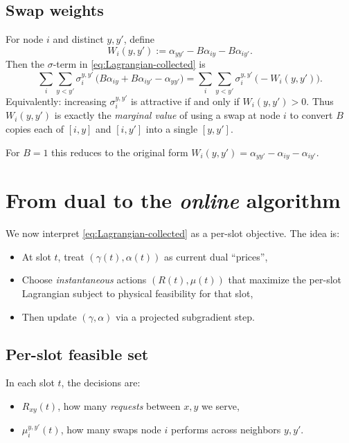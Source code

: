 \documentclass[11pt]{article}
\begin{document}
\subsection{Swap weights}

For node $i$ and distinct $y,y'$, define
\begin{equation}
W_i(y,y')
:= \alpha_{yy'}-B\alpha_{iy}-B\alpha_{iy'}.
\label{eq:Wi-def}
\end{equation}
Then the $\sigma$-term in \eqref{eq:Lagrangian-collected} is
\[
\sum_i \sum_{y<y'}
\sigma_i^{y,y'}\,
\big(
B\alpha_{iy}+B\alpha_{iy'}
-\alpha_{yy'}
\big)
= \sum_i \sum_{y<y'} \sigma_i^{y,y'}\,\big(-W_i(y,y')\big).
\]
Equivalently: increasing $\sigma_i^{y,y'}$ is attractive if and only if $W_i(y,y')>0$. Thus $W_i(y,y')$ is exactly the \emph{marginal value} of using a swap at node $i$ to convert $B$ copies each of $[i,y]$ and $[i,y']$ into a single $[y,y']$.

For $B=1$ this reduces to the original form $W_i(y,y')=\alpha_{yy'}-\alpha_{iy}-\alpha_{iy'}$.

\section{From dual to the \emph{online} algorithm}

We now interpret \eqref{eq:Lagrangian-collected} as a per-slot objective. The idea is:
\begin{itemize}[leftmargin=2em]
\item At slot $t$, treat $(\gamma(t),\alpha(t))$ as current dual ``prices'',
\item Choose \emph{instantaneous} actions $(R(t),\mu(t))$ that maximize the per-slot Lagrangian subject to physical feasibility for that slot,
\item Then update $(\gamma,\alpha)$ via a projected subgradient step.
\end{itemize}

\subsection{Per-slot feasible set}

In each slot $t$, the decisions are:
\begin{itemize}[leftmargin=2em]
\item $R_{xy}(t)$, how many \emph{requests} between $x,y$ we serve,
\item $\mu_i^{y,y'}(t)$, how many swaps node $i$ performs across neighbors $y,y'$.
\end{itemize}
\end{document}
